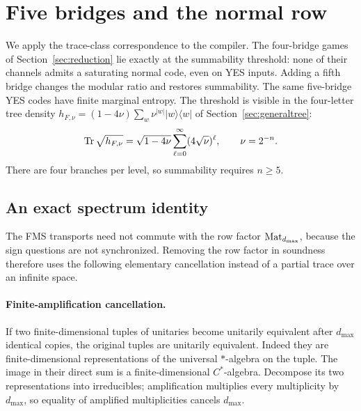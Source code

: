 \section{Five bridges and the normal row}\label{sec:communication}
We apply the trace-class correspondence to the compiler. The four-bridge games of Section~\ref{sec:reduction} lie exactly at the summability threshold: none of their channels admits a saturating normal code, even on YES inputs. Adding a fifth bridge changes the modular ratio and restores summability. The same five-bridge YES codes have finite marginal entropy. The threshold is visible in the four-letter tree density $h_{F,\nu}=(1-4\nu)\sum_w\nu^{|w|}|w\rangle\langle w|$ of Section~\ref{sec:generaltree}:
\[
 \operatorname{Tr}\sqrt{h_{F,\nu}}
 =\sqrt{1-4\nu}\sum_{\ell=0}^{\infty}(4\sqrt\nu)^\ell,
 \qquad \nu=2^{-n}.
\]
There are four branches per level, so summability requires $n\geq5$.

\subsection{An exact spectrum identity}
The FMS transports need not commute with the row factor $\mathrm{Mat}_{d_{\max}}$, because the sign questions are not synchronized. Removing the row factor in soundness therefore uses the following elementary cancellation instead of a partial trace over an infinite space.

\paragraph{Finite-amplification cancellation.}
If two finite-dimensional tuples of unitaries become unitarily equivalent after $d_{\max}$ identical copies, the original tuples are unitarily equivalent. Indeed they are finite-dimensional representations of the universal $*$-algebra on the tuple. The image in their direct sum is a finite-dimensional $C^*$-algebra. Decompose its two representations into irreducibles; amplification multiplies every multiplicity by $d_{\max}$, so equality of amplified multiplicities cancels $d_{\max}$.

